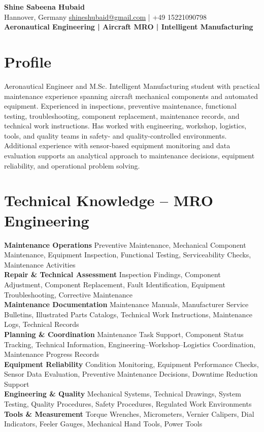 \documentclass[a4paper,10pt]{article}
\newcommand{\skillrow}[2]{
\textbf{#1} #2\\[2pt]
}
\begin{document}
\begin{center}

{\LARGE \textbf{Shine Sabeena Hubaid}}\\[4pt]
Hannover, Germany
\href{mailto:shineshubaid@gmail.com}{shineshubaid@gmail.com} | +49 15221090798\\[5pt]
\textbf{Aeronautical Engineering | Aircraft MRO | Intelligent Manufacturing}

\end{center}
\vspace{-3pt}

\section*{Profile}

Aeronautical Engineer and M.Sc. Intelligent Manufacturing student with practical maintenance experience spanning aircraft mechanical components and automated equipment. Experienced in inspections, preventive maintenance, functional testing, troubleshooting, component replacement, maintenance records, and technical work instructions. Has worked with engineering, workshop, logistics, tools, and quality teams in safety- and quality-controlled environments. Additional experience with sensor-based equipment monitoring and data evaluation supports an analytical approach to maintenance decisions, equipment reliability, and operational problem solving.

\section*{Technical Knowledge -- MRO Engineering}

\skillrow{Maintenance Operations}{Preventive Maintenance, Mechanical Component Maintenance, Equipment Inspection, Functional Testing, Serviceability Checks, Maintenance Activities}
\skillrow{Repair \& Technical Assessment}{Inspection Findings, Component Adjustment, Component Replacement, Fault Identification, Equipment Troubleshooting, Corrective Maintenance}
\skillrow{Maintenance Documentation}{Maintenance Manuals, Manufacturer Service Bulletins, Illustrated Parts Catalogs, Technical Work Instructions, Maintenance Logs, Technical Records}
\skillrow{Planning \& Coordination}{Maintenance Task Support, Component Status Tracking, Technical Information, Engineering--Workshop--Logistics Coordination, Maintenance Progress Records}
\skillrow{Equipment Reliability}{Condition Monitoring, Equipment Performance Checks, Sensor Data Evaluation, Preventive Maintenance Decisions, Downtime Reduction Support}
\skillrow{Engineering \& Quality}{Mechanical Systems, Technical Drawings, System Testing, Quality Procedures, Safety Procedures, Regulated Work Environments}
\skillrow{Tools \& Measurement}{Torque Wrenches, Micrometers, Vernier Calipers, Dial Indicators, Feeler Gauges, Mechanical Hand Tools, Power Tools}
\end{document}
